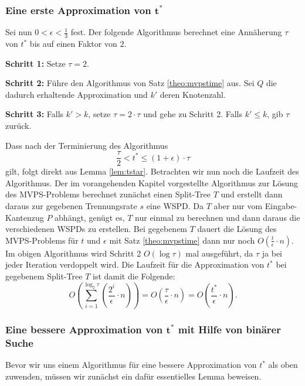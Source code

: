 \subsubsection*{Eine erste Approximation von $\mathbf{t^*}$}

Sei nun $0 < \epsilon < \frac{1}{3}$ fest.
Der folgende Algorithmus berechnet eine Annäherung $\tau$ von $t^*$ bis auf einen Faktor von $2$.
\begin{description}
	\item{\textbf{Schritt 1:}} Setze $\tau = 2$.
	\item{\textbf{Schritt 2:}} Führe den Algorithmus von Satz \ref{theo:mvpstime} aus. Sei $Q$ die dadurch erhaltende Approximation und $k'$ deren Knotenzahl.
	\item{\textbf{Schritt 3:}} Falls $k' > k$, setze $\tau = 2 \cdot \tau$ und gehe zu Schritt 2.
	Falls $k' \leq k$, gib $\tau$ zurück.
\end{description}

Dass nach der Terminierung des Algorithmus 
\[
	\label{eq:tau}
	\frac{\tau}{2} < t^* \leq (1 + \epsilon) \cdot \tau \tag{$\ast$}
\]
gilt, folgt direkt aus Lemma \ref{lem:tstar}. 
Betrachten wir nun noch die Laufzeit des Algorithmus. 
Der im vorangehenden Kapitel vorgestellte Algorithmus zur Lösung des MVPS-Problems berechnet zunächst einen Split-Tree $T$ und erstellt dann daraus zur gegebenen Trennungsrate $s$ eine WSPD. 
Da $T$ aber nur vom Eingabe-Kantenzug $P$ abhängt, genügt es, $T$ nur einmal zu berechnen und dann daraus die verschiedenen WSPDs zu erstellen.
Bei gegebenem $T$ dauert die Lösung des MVPS-Problems für $t$ und $\epsilon$ mit Satz \ref{theo:mvpstime} dann nur noch $O(\frac{t}{\epsilon}\cdot n)$.
Im obigen Algorithmus wird Schritt 2 $O(\log \tau)$ mal ausgeführt, da $\tau$ ja bei jeder Iteration verdoppelt wird.
Die Laufzeit für die Approximation von $t^*$ bei gegebenem Split-Tree $T$ ist damit die Folgende:
\[
O(\sum_{i=1}^{\log_2 \tau} (\frac{2^i}{\epsilon}\cdot n))
= O(\frac{\tau}{\epsilon}\cdot n)
= O(\frac{t^*}{\epsilon}\cdot n).
\]

\subsubsection*{Eine bessere Approximation von $\mathbf{t^*}$ mit Hilfe von binärer Suche}
Bevor wir uns einem Algorithmus für eine bessere Approximation von $t^*$ als oben zuwenden, müssen wir zunächst ein dafür essentielles Lemma beweisen.


